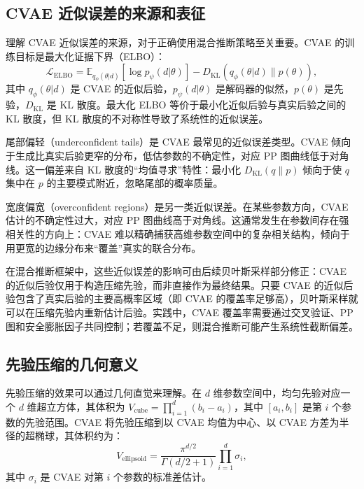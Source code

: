 \subsection{CVAE 近似误差的来源和表征}

理解 CVAE 近似误差的来源，对于正确使用混合推断策略至关重要。CVAE 的训练目标是最大化证据下界（ELBO）：
\begin{equation}
\mathcal{L}_{\text{ELBO}} = \mathbb{E}_{q_\phi(\theta|d)}[\log p_\psi(d|\theta)] - D_{\text{KL}}(q_\phi(\theta|d) \| p(\theta)),
\end{equation}
其中 $q_\phi(\theta|d)$ 是 CVAE 的近似后验，$p_\psi(d|\theta)$ 是解码器的似然，$p(\theta)$ 是先验，$D_{\text{KL}}$ 是 KL 散度。最大化 ELBO 等价于最小化近似后验与真实后验之间的 KL 散度，但 KL 散度的不对称性导致了系统性的近似误差。

尾部偏轻（underconfident tails）是 CVAE 最常见的近似误差类型。CVAE 倾向于生成比真实后验更窄的分布，低估参数的不确定性，对应 PP 图曲线低于对角线。这一偏差来自 KL 散度的“均值寻求”特性：最小化 $D_{\text{KL}}(q \| p)$ 倾向于使 $q$ 集中在 $p$ 的主要模式附近，忽略尾部的概率质量。

宽度偏宽（overconfident regions）是另一类近似误差。在某些参数方向，CVAE 估计的不确定性过大，对应 PP 图曲线高于对角线。这通常发生在参数间存在强相关性的方向上：CVAE 难以精确捕获高维参数空间中的复杂相关结构，倾向于用更宽的边缘分布来“覆盖”真实的联合分布。

在混合推断框架中，这些近似误差的影响可由后续贝叶斯采样部分修正：CVAE 的近似后验仅用于构造压缩先验，而非直接作为最终结果。只要 CVAE 的近似后验包含了真实后验的主要高概率区域（即 CVAE 的覆盖率足够高），贝叶斯采样就可以在压缩先验内重新估计后验。实践中，CVAE 覆盖率需要通过交叉验证、PP图和安全膨胀因子共同控制；若覆盖不足，则混合推断可能产生系统性截断偏差。

\subsection{先验压缩的几何意义}

先验压缩的效果可以通过几何直觉来理解。在 $d$ 维参数空间中，均匀先验对应一个 $d$ 维超立方体，其体积为 $V_{\text{cube}} = \prod_{i=1}^d (b_i - a_i)$，其中 $[a_i, b_i]$ 是第 $i$ 个参数的先验范围。CVAE 将先验压缩到以 CVAE 均值为中心、以 CVAE 方差为半径的超椭球，其体积约为：
\begin{equation}
V_{\text{ellipsoid}} = \frac{\pi^{d/2}}{\Gamma(d/2+1)} \prod_{i=1}^d \sigma_i,
\end{equation}
其中 $\sigma_i$ 是 CVAE 对第 $i$ 个参数的标准差估计。

